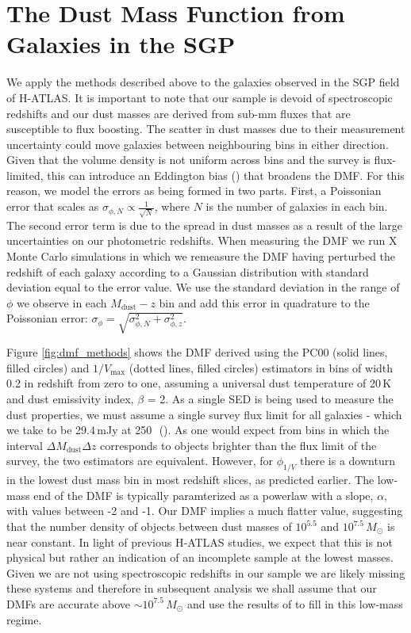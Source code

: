 \section{The Dust Mass Function from Galaxies in the SGP}
\label{sec:dmf_from_sgp}

We apply the methods described above to the galaxies observed in the SGP field of H-ATLAS. It is important to note that our sample is devoid of spectroscopic redshifts and our dust masses are derived from sub-mm fluxes that are susceptible to flux boosting. The scatter in dust masses due to their measurement uncertainty could move galaxies between neighbouring bins in either direction. Given that the volume density is not uniform across bins and the survey is flux-limited, this can introduce an Eddington bias (\citealt{Eddington_1913}) that broadens the DMF. For this reason, we model the errors as being formed in two parts. First, a Poissonian error that scales as $\sigma_{\phi,N} \propto \frac{1}{\sqrt{N}}$, where $N$ is the number of galaxies in each bin. The second error term is due to the spread in dust masses as a result of the large uncertainties on our photometric redshifts. When measuring the DMF we run {\color{red} X} Monte Carlo simulations in which we remeasure the DMF having perturbed the redshift of each galaxy according to a Gaussian distribution with standard deviation equal to the error value. We use the standard deviation in the range of $\phi$ we observe in each $M_{\textrm{dust}} - z$ bin and add this error in quadrature to the Poissonian error: $\sigma_\phi = \sqrt{\sigma_{\phi,N}^2 + \sigma_{\phi,z}^2}$.

Figure \ref{fig:dmf_methods} shows the DMF derived using the PC00 (solid lines, filled circles) and $1/V_{\textrm{max}}$ (dotted lines, filled circles) estimators in bins of width 0.2 in redshift from zero to one, assuming a universal dust temperature of 20\,K and dust emissivity index, $\beta$ = 2. As a single SED is being used to measure the dust properties, we must assume a single survey flux limit for all galaxies - which we take to be 29.4\,mJy at 250\,\micron\ (\citealt{Valiante_2016}). As one would expect from bins in which the interval $\Delta M_{\textrm{dust}} \Delta z$ corresponds to objects brighter than the flux limit of the survey, the two estimators are equivalent. However, for $\phi_{1/V}$ there is a downturn in the lowest dust mass bin in most redshift slices, as predicted earlier. The low-mass end of the DMF is typically paramterized as a powerlaw with a slope, $\alpha$, with values between -2 and -1. Our DMF implies a much flatter value, suggesting that the number density of objects between dust masses of $10^{5.5}$ and $10^{7.5}\,M_{\odot}$ is near constant. In light of previous H-ATLAS studies, we expect that this is not physical but rather an indication of an incomplete sample at the lowest masses. Given we are not using spectroscopic redshifts in our sample we are likely missing these systems and therefore in subsequent analysis we shall assume that our DMFs are accurate above $\sim 10^{7.5}\,M_{\odot}$ and use the results of \citealt{Beeston_2018} to fill in this low-mass regime. 


